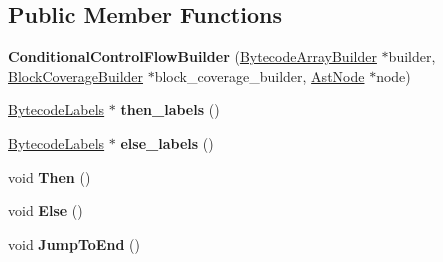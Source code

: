 \subsection*{Public Member Functions}
\begin{DoxyCompactItemize}
\item 
\mbox{\label{classv8_1_1internal_1_1interpreter_1_1ConditionalControlFlowBuilder_a9ee5d0e8997445ce8ea340c0e750e279}} 
{\bfseries Conditional\+Control\+Flow\+Builder} (\mbox{\hyperlink{classv8_1_1internal_1_1interpreter_1_1BytecodeArrayBuilder}{Bytecode\+Array\+Builder}} $\ast$builder, \mbox{\hyperlink{classv8_1_1internal_1_1interpreter_1_1BlockCoverageBuilder}{Block\+Coverage\+Builder}} $\ast$block\+\_\+coverage\+\_\+builder, \mbox{\hyperlink{classv8_1_1internal_1_1AstNode}{Ast\+Node}} $\ast$node)
\item 
\mbox{\label{classv8_1_1internal_1_1interpreter_1_1ConditionalControlFlowBuilder_a96af5b5242340d81aef455c49468e024}} 
\mbox{\hyperlink{classv8_1_1internal_1_1interpreter_1_1BytecodeLabels}{Bytecode\+Labels}} $\ast$ {\bfseries then\+\_\+labels} ()
\item 
\mbox{\label{classv8_1_1internal_1_1interpreter_1_1ConditionalControlFlowBuilder_a7ef24574f9a69d20e55b4ae596fdc951}} 
\mbox{\hyperlink{classv8_1_1internal_1_1interpreter_1_1BytecodeLabels}{Bytecode\+Labels}} $\ast$ {\bfseries else\+\_\+labels} ()
\item 
\mbox{\label{classv8_1_1internal_1_1interpreter_1_1ConditionalControlFlowBuilder_a7b606efe3aeb2caa40a453babb469913}} 
void {\bfseries Then} ()
\item 
\mbox{\label{classv8_1_1internal_1_1interpreter_1_1ConditionalControlFlowBuilder_a87888dddd7728c0f8b169d232f9baf70}} 
void {\bfseries Else} ()
\item 
\mbox{\label{classv8_1_1internal_1_1interpreter_1_1ConditionalControlFlowBuilder_a87e4c19e5a121e6a0462367058699173}} 
void {\bfseries Jump\+To\+End} ()
\end{DoxyCompactItemize}
